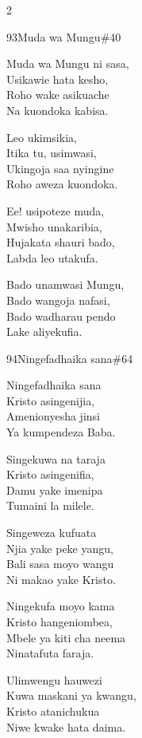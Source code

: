 \documentclass{article}
\begin{document}
\begin{multicols}{2}
\begin{hymn}{93}{Muda wa Mungu}{\#40}
\begin{stanza}
Muda wa Mungu ni sasa,\\
Usikawie hata kesho,\\
Roho wake asikuache\\
Na kuondoka kabisa.
\end{stanza}
\begin{chorus}
Leo ukimsikia,\\
Itika tu, usimwasi,\\
Ukingoja saa nyingine\\
Roho aweza kuondoka.
\end{chorus}
\begin{stanza}
Ee! usipoteze muda,\\
Mwisho unakaribia,\\
Hujakata shauri bado,\\
Labda leo utakufa.
\end{stanza}
\begin{stanza}
Bado unamwasi Mungu,\\
Bado wangoja nafasi,\\
Bado wadharau pendo\\
Lake aliyekufia.
\end{stanza}
\end{hymn}

\begin{hymn}{94}{Ningefadhaika sana}{\#64}
\begin{stanza}
Ningefadhaika sana\\
Kristo asingenijia,\\
Amenionyesha jinsi\\
Ya kumpendeza Baba.
\end{stanza}
\begin{stanza}
Singekuwa na taraja\\
Kristo asingenifia,\\
Damu yake imenipa\\
Tumaini la milele.
\end{stanza}
\begin{stanza}
Singeweza kufuata\\
Njia yake peke yangu,\\
Bali sasa moyo wangu\\
Ni makao yake Kristo.
\end{stanza}
\begin{stanza}
Ningekufa moyo kama\\
Kristo hangeniombea,\\
Mbele ya kiti cha neema\\
Ninatafuta faraja.
\end{stanza}
\begin{stanza}
Ulimwengu hauwezi\\
Kuwa maskani ya kwangu,\\
Kristo atanichukua\\
Niwe kwake hata daima.
\end{stanza}
\end{hymn}


\end{multicols}
\end{document}
